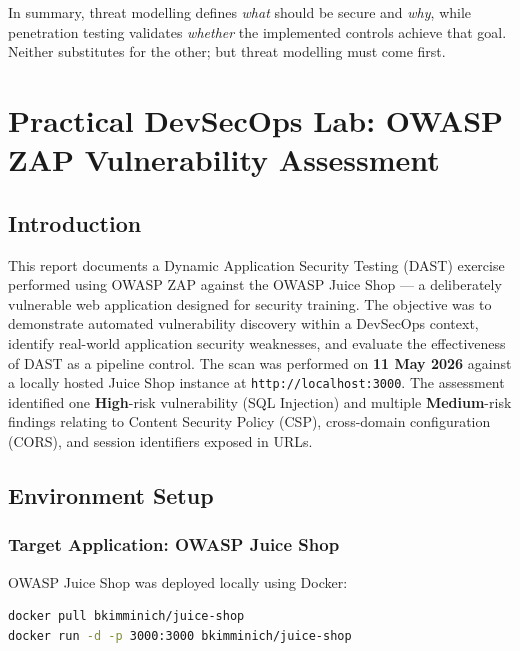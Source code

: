 \documentclass[12pt,a4paper]{article}
\begin{document}
In summary, threat modelling defines \emph{what} should be secure and \emph{why}, while
penetration testing validates \emph{whether} the implemented controls achieve that goal.
Neither substitutes for the other; but threat modelling must come first.

\newpage

\section{Practical DevSecOps Lab: OWASP ZAP Vulnerability Assessment}

\subsection{Introduction}

This report documents a Dynamic Application Security Testing (DAST) exercise performed
using OWASP ZAP \citep{owaspzap} against the OWASP Juice Shop
\citep{owaspjuiceshop} --- a deliberately vulnerable web application designed for security
training. The objective was to demonstrate automated vulnerability discovery within a
DevSecOps context, identify real-world application security weaknesses, and evaluate the
effectiveness of DAST as a pipeline control. The scan was performed on \textbf{11 May
2026} against a locally hosted Juice Shop instance at \texttt{http://localhost:3000}. The
assessment identified one \textbf{High}-risk vulnerability (SQL Injection) and multiple
\textbf{Medium}-risk findings relating to Content Security Policy (CSP),
cross-domain configuration (CORS), and session identifiers exposed in URLs.

\subsection{Environment Setup}

\subsubsection*{Target Application: OWASP Juice Shop}

OWASP Juice Shop was deployed locally using Docker:

\begin{lstlisting}[language=bash, caption={Deploy OWASP Juice Shop via Docker}]
docker pull bkimminich/juice-shop
docker run -d -p 3000:3000 bkimminich/juice-shop
\end{lstlisting}
\end{document}
